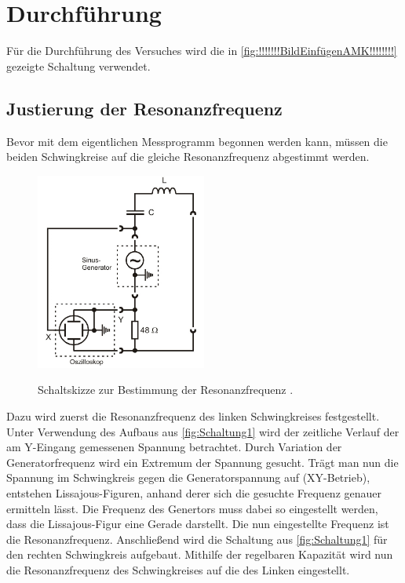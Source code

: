 \section{Durchführung}
\label{sec:Durchführung}
Für die Durchführung des Versuches wird die in \autoref{fig:!!!!!!!BildEinfügenAMK!!!!!!!!} gezeigte Schaltung verwendet. 

\subsection{Justierung der Resonanzfrequenz}
\label{subsec:Justierung}
Bevor mit dem eigentlichen Messprogramm begonnen werden kann, müssen die beiden Schwingkreise auf die gleiche Resonanzfrequenz abgestimmt werden.
\begin{figure}
    \centering
    \includegraphics[width=0.5\textwidth]{content/Schaltung1.jpg}
    \label{fig:Schaltung1}
	\caption{Schaltskizze zur Bestimmung der Resonanzfrequenz \cite{v355}.}
\end{figure}
Dazu wird zuerst die Resonanzfrequenz des linken Schwingkreises festgestellt. Unter Verwendung des Aufbaus aus \autoref{fig:Schaltung1} wird 
der zeitliche Verlauf der am Y-Eingang gemessenen Spannung betrachtet. Durch Variation der Generatorfrequenz wird ein Extremum der Spannung gesucht. Trägt 
man nun die Spannung im Schwingkreis gegen die Generatorspannung auf (XY-Betrieb), entstehen Lissajous-Figuren, anhand derer sich die gesuchte Frequenz genauer
ermitteln lässt. Die Frequenz des Genertors muss dabei so eingestellt werden, dass die Lissajous-Figur eine Gerade darstellt. Die nun eingestellte Frequenz ist
die Resonanzfrequenz. Anschließend wird die Schaltung aus \autoref{fig:Schaltung1} für den rechten Schwingkreis aufgebaut. Mithilfe der regelbaren Kapazität
wird nun die Resonanzfrequenz des Schwingkreises auf die des Linken eingestellt.


